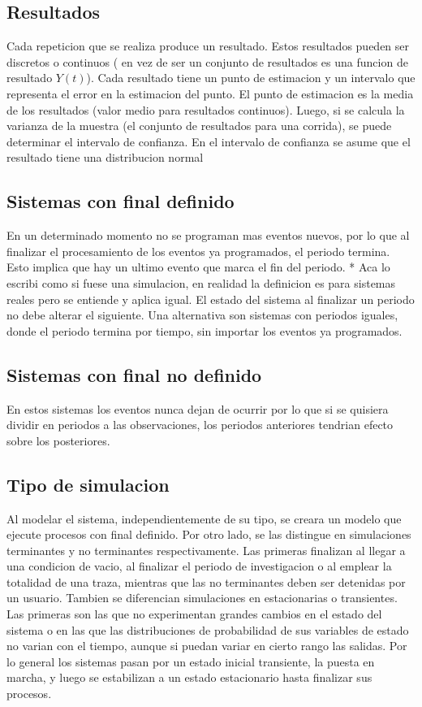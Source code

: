 \documentclass[a4paper]{article}
\begin{document}
\subsection*{Resultados}
Cada repeticion que se realiza produce un resultado. Estos resultados pueden ser discretos o continuos (
en vez de ser un conjunto de resultados es una funcion de resultado $Y(t)$).
Cada resultado tiene un punto de estimacion y un intervalo que representa el error en la estimacion del punto.
El punto de estimacion es la media de los resultados (valor medio para resultados continuos).
Luego, si se calcula la varianza de la muestra (el conjunto de resultados para una corrida), se puede determinar 
el intervalo de confianza. En el intervalo de confianza se asume que el resultado tiene una distribucion normal

\subsection*{Sistemas con final definido}
En un determinado momento no se programan mas eventos nuevos, por lo que al finalizar el procesamiento 
de los eventos ya programados, el periodo termina. Esto implica que hay un ultimo evento que marca el fin del
periodo. * Aca lo escribi como si fuese una simulacion, en realidad la definicion es para sistemas reales pero se 
entiende y aplica igual.
El estado del sistema al finalizar un periodo no debe alterar el siguiente.
Una alternativa son sistemas con periodos iguales, donde el periodo termina por tiempo, sin importar los eventos 
ya programados.

\subsection*{Sistemas con final no definido}
En estos sistemas los eventos nunca dejan de ocurrir por lo que si se quisiera dividir en periodos a las observaciones,
los periodos anteriores tendrian efecto sobre los posteriores.

\subsection*{Tipo de simulacion}
Al modelar el sistema, independientemente de su tipo, se creara un modelo que ejecute procesos con final definido.
Por otro lado, se las distingue en simulaciones terminantes y no terminantes respectivamente.
Las primeras finalizan al llegar a una condicion de vacio, al finalizar el periodo de investigacion o al 
emplear la totalidad de una traza, mientras que las no terminantes deben ser detenidas por un usuario.
Tambien se diferencian simulaciones en estacionarias o transientes. Las primeras son las que no experimentan 
grandes cambios en el estado del sistema o en las que las distribuciones de probabilidad de sus variables de 
estado no varian con el tiempo, aunque si puedan variar en cierto rango las salidas. Por lo general los sistemas
pasan por un estado inicial transiente, la puesta en marcha, y luego se estabilizan a un estado estacionario 
hasta finalizar sus procesos.
\end{document}
